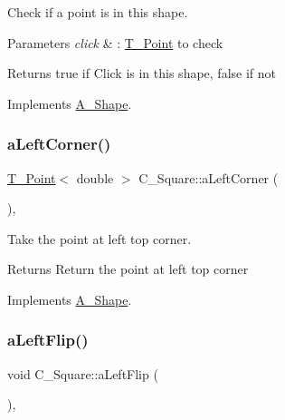 Check if a point is in this shape. 


\begin{DoxyParams}{Parameters}
{\em click} & \+: \hyperlink{classT__Point}{T\+\_\+\+Point} to check \\
\hline
\end{DoxyParams}
\begin{DoxyReturn}{Returns}
true if Click is in this shape, false if not 
\end{DoxyReturn}


Implements \hyperlink{classA__Shape_a63f825cbc9780208d9a137f5c14917d0}{A\+\_\+\+Shape}.

\mbox{\label{classC__Square_a13e97bb379f1678636e3baf781c2a01b}} 
\subsubsection{\texorpdfstring{a\+Left\+Corner()}{aLeftCorner()}}
{\footnotesize\ttfamily \hyperlink{classT__Point}{T\+\_\+\+Point}$<$ double $>$ C\+\_\+\+Square\+::a\+Left\+Corner (\begin{DoxyParamCaption}{ }\end{DoxyParamCaption})\hspace{0.3cm}{\ttfamily [override]}, {\ttfamily [virtual]}}



Take the point at left top corner. 

\begin{DoxyReturn}{Returns}
Return the point at left top corner 
\end{DoxyReturn}


Implements \hyperlink{classA__Shape_abe6781b13037bf7ecea8ff9456b31533}{A\+\_\+\+Shape}.

\mbox{\label{classC__Square_a31d31862502f0ed24e8331af30100338}} 
\subsubsection{\texorpdfstring{a\+Left\+Flip()}{aLeftFlip()}}
{\footnotesize\ttfamily void C\+\_\+\+Square\+::a\+Left\+Flip (\begin{DoxyParamCaption}{ }\end{DoxyParamCaption})\hspace{0.3cm}{\ttfamily [override]}, {\ttfamily [virtual]}}



